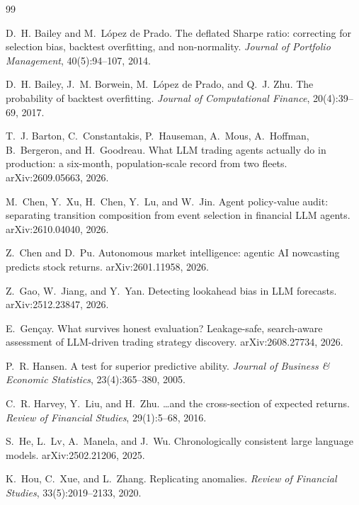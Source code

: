 \documentclass[11pt]{article}
\begin{document}
\begin{thebibliography}{99}\small

D.~H. Bailey and M.~L{\'o}pez de Prado.
\newblock The deflated Sharpe ratio: correcting for selection bias, backtest
overfitting, and non-normality.
\newblock \emph{Journal of Portfolio Management}, 40(5):94--107, 2014.

D.~H. Bailey, J.~M. Borwein, M.~L{\'o}pez de Prado, and Q.~J. Zhu.
\newblock The probability of backtest overfitting.
\newblock \emph{Journal of Computational Finance}, 20(4):39--69, 2017.

T.~J. Barton, C.~Constantakis, P.~Hauseman, A.~Mous, A.~Hoffman, B.~Bergeron,
and H.~Goodreau.
\newblock What LLM trading agents actually do in production: a six-month,
population-scale record from two fleets.
\newblock arXiv:2609.05663, 2026.

M.~Chen, Y.~Xu, H.~Chen, Y.~Lu, and W.~Jin.
\newblock Agent policy-value audit: separating transition composition from event
selection in financial LLM agents.
\newblock arXiv:2610.04040, 2026.

Z.~Chen and D.~Pu.
\newblock Autonomous market intelligence: agentic AI nowcasting predicts stock
returns.
\newblock arXiv:2601.11958, 2026.

Z.~Gao, W.~Jiang, and Y.~Yan.
\newblock Detecting lookahead bias in LLM forecasts.
\newblock arXiv:2512.23847, 2026.

E.~Gen\c{c}ay.
\newblock What survives honest evaluation? Leakage-safe, search-aware
assessment of LLM-driven trading strategy discovery.
\newblock arXiv:2608.27734, 2026.

P.~R. Hansen.
\newblock A test for superior predictive ability.
\newblock \emph{Journal of Business \& Economic Statistics}, 23(4):365--380,
2005.

C.~R. Harvey, Y.~Liu, and H.~Zhu.
\newblock \ldots and the cross-section of expected returns.
\newblock \emph{Review of Financial Studies}, 29(1):5--68, 2016.

S.~He, L.~Lv, A.~Manela, and J.~Wu.
\newblock Chronologically consistent large language models.
\newblock arXiv:2502.21206, 2025.

K.~Hou, C.~Xue, and L.~Zhang.
\newblock Replicating anomalies.
\newblock \emph{Review of Financial Studies}, 33(5):2019--2133, 2020.


\end{thebibliography}
\end{document}
